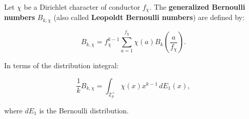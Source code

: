 Let $\chi$ be a Dirichlet character of conductor $f_\chi$. The \textbf{generalized
Bernoulli numbers} $B_{k,\chi}$ (also called \textbf{Leopoldt Bernoulli numbers}) are
defined by:

$$B_{k,\chi} = f_\chi^{k-1} \sum_{a=1}^{f_\chi} \chi(a) B_k\!\left(\frac{a}{f_\chi}\right).$$

In terms of the distribution integral:

$$\frac{1}{k} B_{k,\chi} = \int_{\mathbb{Z}_p^\times} \chi(x) x^{k-1} \, dE_1(x),$$

where $dE_1$ is the Bernoulli distribution.
